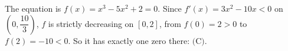 The equation is $f(x)=x^3-5x^2+2=0$. Since $f'(x)=3x^2-10x<0$ on $\left(0,\dfrac{10}{3}\right)$, $f$ is strictly decreasing on $[0,2]$, from $f(0)=2>0$ to $f(2)=-10<0$. So it has exactly one zero there: $\boxed{\text{(C)}}$.

